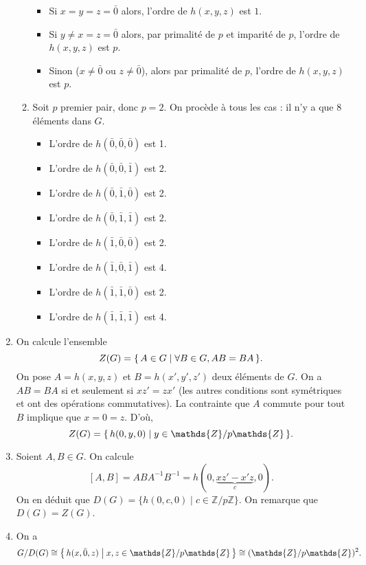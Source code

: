 \documentclass{../../td}
\begin{document}
\begin{enumerate}
\begin{enumerate}
          \begin{itemize}
            \item Si $x = y = z = \bar{0}$ alors, l'ordre de $h(x,y,z)$ est $1$.
            \item Si $y \neq x = z = \bar{0}$ alors, par primalité de $p$ et imparité de $p$, l'ordre de $h(x,y,z)$ est $p$.
            \item Sinon ($x \neq \bar{0}$ ou $z \neq \bar{0}$), alors par primalité de $p$, l'ordre de $h(x,y,z)$ est $p$.
          \end{itemize}
        \item Soit $p$ premier pair, donc $p = 2$.
          On procède à tous les cas : il n'y a que 8 éléments dans $G$.
          \begin{itemize}
            \item L'ordre de $h(\bar0,\bar0,\bar0)$ est 1.
            \item L'ordre de $h(\bar0,\bar0,\bar1)$ est 2.
            \item L'ordre de $h(\bar0,\bar1,\bar0)$ est 2.
            \item L'ordre de $h(\bar0,\bar1,\bar1)$ est 2.
            \item L'ordre de $h(\bar1,\bar0,\bar0)$ est 2.
            \item L'ordre de $h(\bar1,\bar0,\bar1)$ est 4.
            \item L'ordre de $h(\bar1,\bar1,\bar0)$ est 2.
            \item L'ordre de $h(\bar1,\bar1,\bar1)$ est 4.
          \end{itemize}
      \end{enumerate}
    \item On calcule l'ensemble \[
        Z(G) = \mleft\{\, A \in G \;\middle|\; \forall B \in G, AB = BA\,\mright\} 
      .\] 
      On pose $A = h(x,y,z)$ et $B = h(x',y',z')$ deux éléments de $G$.
      On a $AB = BA$ si et seulement si $x z' = z x'$ (les autres conditions sont symétriques et ont des opérations commutatives). La contrainte que $A$ commute pour tout $B$ implique que $x = 0 = z$.
      D'où, \[
        Z(G) = \mleft\{\,h(0,y,0) \;\middle|\; y \in  \mathds{Z}/ p \mathds{Z} \,\mright\} 
      .\]
    \item Soient $A, B \in G$.
      On calcule 
      \[
        [A,B] = A B A^{-1} B^{-1} = h(0, \underbrace{x z' - x' z}_c, 0)
      .\]
      On en déduit que $D(G) = \{h(0,c,0)  \mid c \in \mathds{Z} / p \mathds{Z}\}$.
      On remarque que $D(G) = Z(G)$.
    \item On a \[
    G / D(G) \cong \mleft\{\,h(x,\bar0,z) \;\middle|\;x,z \in \mathds{Z}/p\mathds{Z} \,\mright\} \cong (\mathds{Z} / p \mathds{Z})^2
    .\]
  \end{enumerate}

  \vfill

  \begin{center}
    \color{deepblue}
  \end{center}


  \vfill
\end{document}
